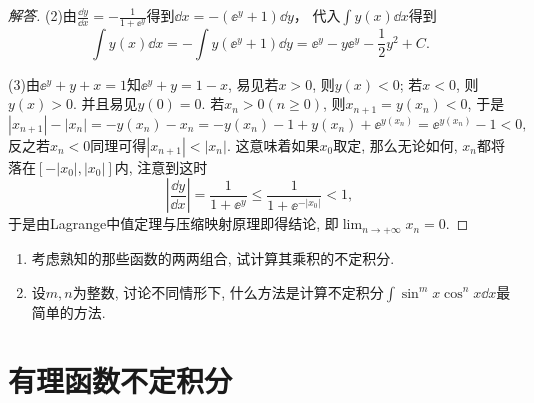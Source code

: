 \begin{3a}
\begin{enumerate}
\begin{proof}[解答]
(2)由\(\frac{\dd y}{\dd x}=-\frac{1}{1+\ee^y}\)得到\(\dd x=-(\ee^y+1)\dd y\)，
代入\(\int y(x)\dd x\)得到\[\int y(x)\dd x=-\int y(\ee^y+1)\dd y=\ee^y-y\ee^y-\frac{1}{2}y^2+C.\]

(3)由\(\ee^y+y+x=1\)知\(\ee^y+y=1-x\), 
易见若\(x>0\), 则\(y(x)<0\); 若\(x<0\), 则\(y(x)>0\). 
并且易见\(y(0)=0\). 若\(x_n>0(n\geqslant 0)\), 则\(x_{n+1}=y(x_n)<0\), 于是
\[|x_{n+1}|-|x_{n}|=-y(x_n)-x_n=-y(x_n)-1+y(x_n)+\ee^{y(x_n)}=\ee^{y(x_n)}-1<0,\]
反之若\(x_n<0\)同理可得\(|x_{n+1}|<|x_n|\). 
这意味着如果\(x_0\)取定, 那么无论如何, \(x_n\)都将落在\([-|x_0|,|x_0|]\)内, 注意到这时
\[\left|\frac{\dd y}{\dd x}\right|=\frac{1}{1+\ee^y}\leqslant\frac{1}{1+\ee^{-|x_0|}}<1,\]
于是由Lagrange中值定理与压缩映射原理即得结论, 即\(\lim_{n\rightarrow+\infty}x_n=0\).
\end{proof}
\end{enumerate}
\end{3a}
\begin{3b}
\begin{enumerate}
\item 考虑熟知的那些函数的两两组合, 试计算其乘积的不定积分.
\item 设\(m,n\)为整数, 讨论不同情形下, 什么方法是计算不定积分\(\int\sin^m x\cos^nx\dd x\)最简单的方法.
\end{enumerate}
\end{3b}
\section{有理函数不定积分}
